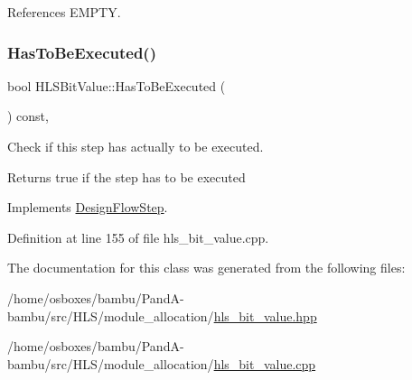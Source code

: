 References E\+M\+P\+TY.

\mbox{\label{classHLSBitValue_a49f19f5709798c91fa14970e17ca26a3}} 
\subsubsection{\texorpdfstring{Has\+To\+Be\+Executed()}{HasToBeExecuted()}}
{\footnotesize\ttfamily bool H\+L\+S\+Bit\+Value\+::\+Has\+To\+Be\+Executed (\begin{DoxyParamCaption}{ }\end{DoxyParamCaption}) const\hspace{0.3cm}{\ttfamily [override]}, {\ttfamily [virtual]}}



Check if this step has actually to be executed. 

\begin{DoxyReturn}{Returns}
true if the step has to be executed 
\end{DoxyReturn}


Implements \hyperlink{classDesignFlowStep_a1783abe0c1d162a52da1e413d5d1ef05}{Design\+Flow\+Step}.



Definition at line 155 of file hls\+\_\+bit\+\_\+value.\+cpp.



The documentation for this class was generated from the following files\+:\begin{DoxyCompactItemize}
\item 
/home/osboxes/bambu/\+Pand\+A-\/bambu/src/\+H\+L\+S/module\+\_\+allocation/\hyperlink{hls__bit__value_8hpp}{hls\+\_\+bit\+\_\+value.\+hpp}\item 
/home/osboxes/bambu/\+Pand\+A-\/bambu/src/\+H\+L\+S/module\+\_\+allocation/\hyperlink{hls__bit__value_8cpp}{hls\+\_\+bit\+\_\+value.\+cpp}\end{DoxyCompactItemize}
